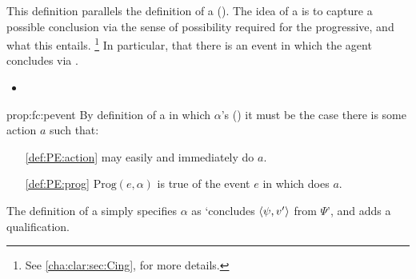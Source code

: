 \begin{note}[\fc{2} definition]
  This definition parallels the definition of a \pevent{} ().
  The idea of a \fc{} is to capture a possible conclusion via the sense of possibility required for the progressive, and what this entails.%
  \footnote{
    See \autoref{cha:clar:sec:Cing},  for more details.
  }
  In particular, that there is an event in which the agent concludes via \assuPP{}.

  \begin{proposition}%
    \label{prop:fc:pevent}%
    \begin{itemize}
    \item
    \end{itemize}
    \vspace{-\baselineskip}
  \end{proposition}

  \begin{argument}{prop:fc:pevent}
    By definition of a \pevent{} in which \vAgent{} \(\alpha\)'s (\peventpage{}) it must be the case there is some action \(a\) such that:
    \begin{enumerate}[noitemsep]
    \item[\ref{def:PE:action}]
      \vAgent{} may easily and immediately do \(a\).
    \item[\ref{def:PE:prog}]
      \(\text{Prog}(e, \alpha)\) is true of the event \(e\) in which \vAgent{} does \(a\).
    \end{enumerate}
    The definition of a \fc{} simply specifies \(\alpha\) as `concludes \(\langle \psi, v' \rangle\) from \(\Psi\)', and adds a qualification.
  \end{argument}


\end{note}
